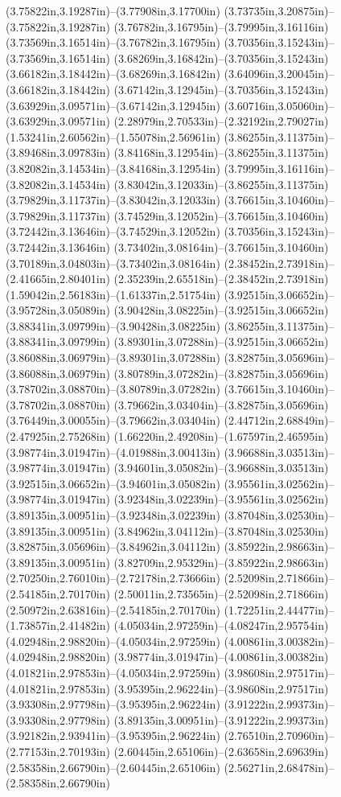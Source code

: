 (3.75822in,3.19287in)--(3.77908in,3.17700in) (3.73735in,3.20875in)--(3.75822in,3.19287in) (3.76782in,3.16795in)--(3.79995in,3.16116in) (3.73569in,3.16514in)--(3.76782in,3.16795in) (3.70356in,3.15243in)--(3.73569in,3.16514in) (3.68269in,3.16842in)--(3.70356in,3.15243in) (3.66182in,3.18442in)--(3.68269in,3.16842in) (3.64096in,3.20045in)--(3.66182in,3.18442in) (3.67142in,3.12945in)--(3.70356in,3.15243in) (3.63929in,3.09571in)--(3.67142in,3.12945in) (3.60716in,3.05060in)--(3.63929in,3.09571in) (2.28979in,2.70533in)--(2.32192in,2.79027in) (1.53241in,2.60562in)--(1.55078in,2.56961in) (3.86255in,3.11375in)--(3.89468in,3.09783in) (3.84168in,3.12954in)--(3.86255in,3.11375in) (3.82082in,3.14534in)--(3.84168in,3.12954in) (3.79995in,3.16116in)--(3.82082in,3.14534in) (3.83042in,3.12033in)--(3.86255in,3.11375in) (3.79829in,3.11737in)--(3.83042in,3.12033in) (3.76615in,3.10460in)--(3.79829in,3.11737in) (3.74529in,3.12052in)--(3.76615in,3.10460in) (3.72442in,3.13646in)--(3.74529in,3.12052in) (3.70356in,3.15243in)--(3.72442in,3.13646in) (3.73402in,3.08164in)--(3.76615in,3.10460in) (3.70189in,3.04803in)--(3.73402in,3.08164in) (2.38452in,2.73918in)--(2.41665in,2.80401in) (2.35239in,2.65518in)--(2.38452in,2.73918in) (1.59042in,2.56183in)--(1.61337in,2.51754in) (3.92515in,3.06652in)--(3.95728in,3.05089in) (3.90428in,3.08225in)--(3.92515in,3.06652in) (3.88341in,3.09799in)--(3.90428in,3.08225in) (3.86255in,3.11375in)--(3.88341in,3.09799in) (3.89301in,3.07288in)--(3.92515in,3.06652in) (3.86088in,3.06979in)--(3.89301in,3.07288in) (3.82875in,3.05696in)--(3.86088in,3.06979in) (3.80789in,3.07282in)--(3.82875in,3.05696in) (3.78702in,3.08870in)--(3.80789in,3.07282in) (3.76615in,3.10460in)--(3.78702in,3.08870in) (3.79662in,3.03404in)--(3.82875in,3.05696in) (3.76449in,3.00055in)--(3.79662in,3.03404in) (2.44712in,2.68849in)--(2.47925in,2.75268in) (1.66220in,2.49208in)--(1.67597in,2.46595in) (3.98774in,3.01947in)--(4.01988in,3.00413in) (3.96688in,3.03513in)--(3.98774in,3.01947in) (3.94601in,3.05082in)--(3.96688in,3.03513in) (3.92515in,3.06652in)--(3.94601in,3.05082in) (3.95561in,3.02562in)--(3.98774in,3.01947in) (3.92348in,3.02239in)--(3.95561in,3.02562in) (3.89135in,3.00951in)--(3.92348in,3.02239in) (3.87048in,3.02530in)--(3.89135in,3.00951in) (3.84962in,3.04112in)--(3.87048in,3.02530in) (3.82875in,3.05696in)--(3.84962in,3.04112in) (3.85922in,2.98663in)--(3.89135in,3.00951in) (3.82709in,2.95329in)--(3.85922in,2.98663in) (2.70250in,2.76010in)--(2.72178in,2.73666in) (2.52098in,2.71866in)--(2.54185in,2.70170in) (2.50011in,2.73565in)--(2.52098in,2.71866in) (2.50972in,2.63816in)--(2.54185in,2.70170in) (1.72251in,2.44477in)--(1.73857in,2.41482in) (4.05034in,2.97259in)--(4.08247in,2.95754in) (4.02948in,2.98820in)--(4.05034in,2.97259in) (4.00861in,3.00382in)--(4.02948in,2.98820in) (3.98774in,3.01947in)--(4.00861in,3.00382in) (4.01821in,2.97853in)--(4.05034in,2.97259in) (3.98608in,2.97517in)--(4.01821in,2.97853in) (3.95395in,2.96224in)--(3.98608in,2.97517in) (3.93308in,2.97798in)--(3.95395in,2.96224in) (3.91222in,2.99373in)--(3.93308in,2.97798in) (3.89135in,3.00951in)--(3.91222in,2.99373in) (3.92182in,2.93941in)--(3.95395in,2.96224in) (2.76510in,2.70960in)--(2.77153in,2.70193in) (2.60445in,2.65106in)--(2.63658in,2.69639in) (2.58358in,2.66790in)--(2.60445in,2.65106in) (2.56271in,2.68478in)--(2.58358in,2.66790in) 